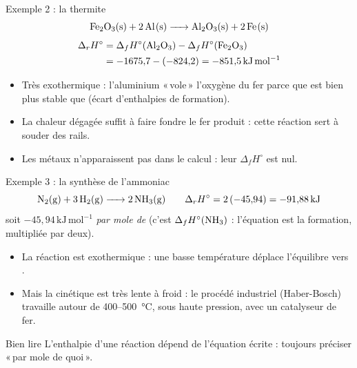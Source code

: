 \documentclass[aspectratio=169,10pt]{beamer}
\newcommand{\dfH}{\Delta_{f}H^{\circ}}
\newcommand{\drH}{\Delta_{r}H^{\circ}}
\newcommand{\kJ}{\ensuremath{\,\mathrm{kJ}}}
\newcommand{\kJmol}{\ensuremath{\,\mathrm{kJ\,mol^{-1}}}}
\newcommand{\guil}[1]{«\,#1\,»}
\begin{document}
\begin{frame}{Exemple 2 : la thermite}
  \[ \ce{Fe2O3(s) + 2 Al(s) -> Al2O3(s) + 2 Fe(s)} \]
  \begin{align*}
    \drH &= \dfH(\ce{Al2O3}) - \dfH(\ce{Fe2O3})\\
         &= -1675{,}7 - (-824{,}2) = -851{,}5\kJmol
  \end{align*}
  \begin{itemize}
    \item Très exothermique : l'aluminium \guil{vole} l'oxygène du fer parce
      que  est bien plus stable que  (écart d'enthalpies
      de formation).
    \item La chaleur dégagée suffit à faire fondre le fer produit : cette réaction sert à
      souder des rails.
    \item Les métaux n'apparaissent pas dans le calcul : leur $\dfH$ est nul.
  \end{itemize}
\end{frame}

\begin{frame}{Exemple 3 : la synthèse de l'ammoniac}
  \[ \ce{N2(g) + 3 H2(g) -> 2 NH3(g)} \qquad
     \drH = 2\,(-45{,}94) = -91{,}88\kJ \]
  soit $-45{,}94\kJmol$ \emph{par mole de}  (c'est $\dfH(\ce{NH3})$ :
  l'équation est la formation, multipliée par deux).
  \vspace{2mm}
  \begin{itemize}
    \item La réaction est exothermique : une basse température déplace
      l'équilibre vers .
    \item Mais la cinétique est très lente à froid : le procédé industriel
      (Haber-Bosch) travaille autour de 400--500~°C, sous haute pression, avec un
      catalyseur de fer.
  \end{itemize}
  \begin{alertblock}{Bien lire}
    L'enthalpie d'une réaction dépend de l'équation écrite : toujours préciser
    \guil{par mole de quoi}.
  \end{alertblock}
\end{frame}
\end{document}
